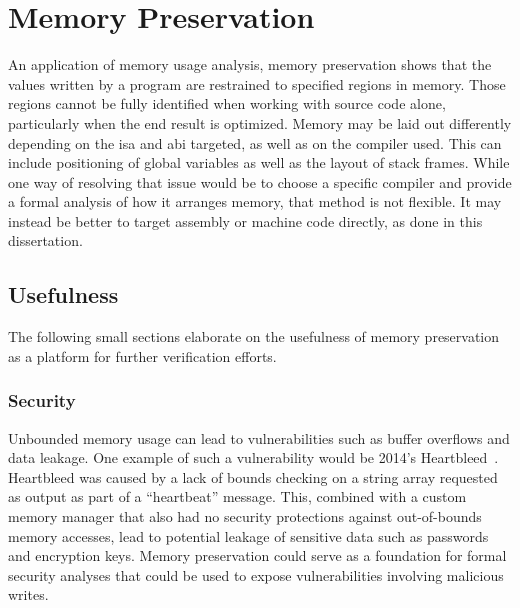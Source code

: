 \section{Memory Preservation}\label{se:memory_preservation}

An application of memory usage analysis,
memory preservation shows that the values written by a program%
are restrained to specified regions in memory.
Those regions cannot be fully identified when working with source code alone,
particularly when the end result is optimized.
Memory may be laid out differently depending on the \ac{isa} and \ac{abi} targeted,
as well as on the compiler used.
This can include positioning of global variables
as well as the layout of stack frames.
While one way of resolving that issue would be to choose a specific compiler
and provide a formal analysis of how it arranges memory, that method is not flexible.
It may instead be better to target assembly or machine code directly,
as done in this dissertation.

\subsection{Usefulness}
The following small sections elaborate on the usefulness of memory preservation
as a platform for further verification efforts.

\subsubsection{Security}
Unbounded memory usage can lead to vulnerabilities
such as buffer overflows and data leakage.
One example of such a vulnerability would be 2014's Heartbleed~\citep{heartbleed}.
Heartbleed was caused by a lack of bounds checking on a string array
requested as output as part of a ``heartbeat'' message.
This, combined with a custom memory manager
that also had no security protections against out-of-bounds memory accesses,
lead to potential leakage of sensitive data such as passwords and encryption keys.
Memory preservation could serve as a foundation for formal security analyses
that could be used to expose vulnerabilities involving malicious writes.

